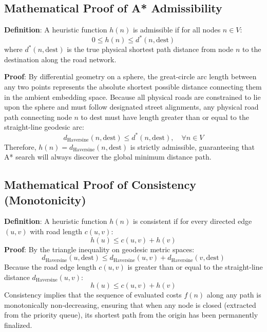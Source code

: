 \documentclass[conference]{IEEEtran}
\begin{document}
\subsection{Mathematical Proof of A* Admissibility}
\textbf{Definition}: A heuristic function $h(n)$ is admissible if for all nodes $n \in V$:
\begin{equation}
0 \le h(n) \le d^*(n, \text{dest})
\end{equation}
where $d^*(n, \text{dest})$ is the true physical shortest path distance from node $n$ to the destination along the road network.

\textbf{Proof}: By differential geometry on a sphere, the great-circle arc length between any two points represents the absolute shortest possible distance connecting them in the ambient embedding space. Because all physical roads are constrained to lie upon the sphere and must follow designated street alignments, any physical road path connecting node $n$ to $\text{dest}$ must have length greater than or equal to the straight-line geodesic arc:
\begin{equation}
d_{\text{Haversine}}(n, \text{dest}) \le d^*(n, \text{dest}), \quad \forall n \in V
\end{equation}
Therefore, $h(n) = d_{\text{Haversine}}(n, \text{dest})$ is strictly admissible, guaranteeing that A* search will always discover the global minimum distance path.

\subsection{Mathematical Proof of Consistency (Monotonicity)}
\textbf{Definition}: A heuristic function $h(n)$ is consistent if for every directed edge $(u, v)$ with road length $c(u, v)$:
\begin{equation}
h(u) \le c(u, v) + h(v)
\label{eq:consistency}
\end{equation}
\textbf{Proof}: By the triangle inequality on geodesic metric spaces:
\begin{equation}
d_{\text{Haversine}}(u, \text{dest}) \le d_{\text{Haversine}}(u, v) + d_{\text{Haversine}}(v, \text{dest})
\end{equation}
Because the road edge length $c(u, v)$ is greater than or equal to the straight-line distance $d_{\text{Haversine}}(u, v)$:
\begin{equation}
h(u) \le c(u, v) + h(v)
\end{equation}
Consistency implies that the sequence of evaluated costs $f(n)$ along any path is monotonically non-decreasing, ensuring that when any node is closed (extracted from the priority queue), its shortest path from the origin has been permanently finalized.
\end{document}
